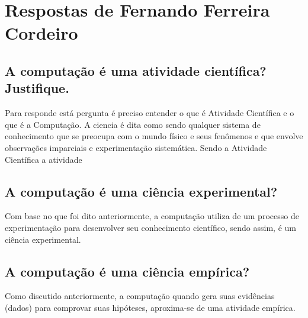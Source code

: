 \section{Respostas de Fernando Ferreira Cordeiro\label{tarefa-jhcf-componentes-eperimento}}


\subsection{A computação é uma atividade científica? Justifique.
}
Para responde está pergunta é preciso entender o que é Atividade Científica e o que é a Computação.
A ciencia é dita como sendo qualquer sistema de conhecimento que se preocupa com o mundo físico e seus fenômenos e que envolve 
observações imparciais e experimentação sistemática. Sendo a Atividade Científica a atividade 


\subsection{A computação é uma ciência experimental?}

Com base no que foi dito anteriormente, a computação utiliza de um processo de experimentação para desenvolver seu conhecimento científico, sendo assim, é um ciência experimental.

\subsection{A computação é uma ciência empírica?}

Como discutido anteriormente, a computação quando gera suas evidências (dados) para comprovar suas hipóteses, aproxima-se de uma atividade empírica.